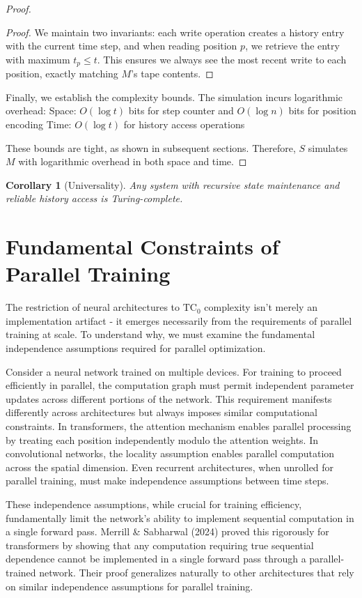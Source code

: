 \documentclass[12pt]{article}
\newtheorem{corollary}[theorem]{Corollary}
\begin{document}
\begin{proof}
\begin{proof}
We maintain two invariants: each write operation creates a history entry with the current time step, and when reading position $p$, we retrieve the entry with maximum $t_p \leq t$. This ensures we always see the most recent write to each position, exactly matching $M$'s tape contents.
\end{proof}

Finally, we establish the complexity bounds. The simulation incurs logarithmic overhead:
Space: $O(\log t)$ bits for step counter and $O(\log n)$ bits for position encoding
Time: $O(\log t)$ for history access operations

These bounds are tight, as shown in subsequent sections. Therefore, $S$ simulates $M$ with logarithmic overhead in both space and time.
\end{proof}

\begin{corollary}[Universality]
Any system with recursive state maintenance and reliable history access is Turing-complete.
\end{corollary}

\section{Fundamental Constraints of Parallel Training}

The restriction of neural architectures to $\text{TC}_0$ complexity isn't merely an implementation artifact - it emerges necessarily from the requirements of parallel training at scale. To understand why, we must examine the fundamental independence assumptions required for parallel optimization.

Consider a neural network trained on multiple devices. For training to proceed efficiently in parallel, the computation graph must permit independent parameter updates across different portions of the network. This requirement manifests differently across architectures but always imposes similar computational constraints. In transformers, the attention mechanism enables parallel processing by treating each position independently modulo the attention weights. In convolutional networks, the locality assumption enables parallel computation across the spatial dimension. Even recurrent architectures, when unrolled for parallel training, must make independence assumptions between time steps.

These independence assumptions, while crucial for training efficiency, fundamentally limit the network's ability to implement sequential computation in a single forward pass. Merrill \& Sabharwal (2024) proved this rigorously for transformers by showing that any computation requiring true sequential dependence cannot be implemented in a single forward pass through a parallel-trained network. Their proof generalizes naturally to other architectures that rely on similar independence assumptions for parallel training.
\end{document}
